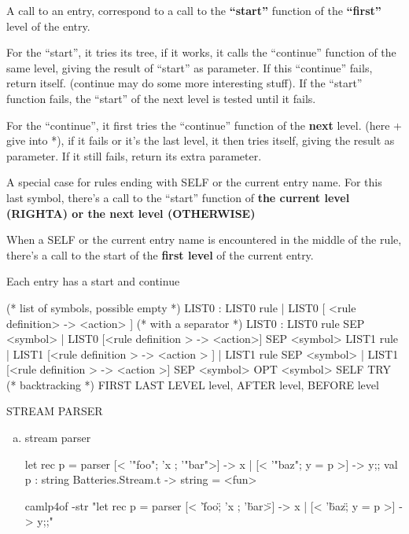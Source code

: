 \begin{enumerate}[(a)]
  A call to an entry, correspond to a call to the \textbf{``start''} function of
  the \textbf{``first''} level of the entry.

  For the ``start'', it tries its tree, if it works, it calls the
  ``continue'' function of the same level, giving the result of ``start''
  as parameter. If this ``continue'' fails, return itself. (continue may
  do some more interesting stuff). If the ``start'' function fails, the
  ``start'' of the next level is tested until it fails. 


  For the ``continue'', it first tries the ``continue'' function of the
  \textbf{next} level. (here + give into *), if it fails or it's the
  last level, it then tries itself, giving the result as parameter. If
  it still fails, return its extra parameter.

  A special case for rules ending with SELF or the current entry
  name. For this last symbol, there's a call to the ``start'' function
  of \textbf{the current level (RIGHTA) or the next level (OTHERWISE)}

  When a SELF or the current entry name is encountered in the middle
  of the rule, there's a call to the start of the \textbf{first level} of the
  current entry.

  Each entry has a start and continue

\begin{bluecode}
(* list of symbols, possible empty *)
LIST0 : LIST0 rule | LIST0 [ <rule definition> -> <action> ]
(* with a separator *)
LIST0 : LIST0 rule SEP <symbol>
| LIST0 [<rule definition > -> <action>] SEP <symbol>
  LIST1 rule
| LIST1 [<rule definition > -> <action > ]
| LIST1 rule SEP <symbol>
| LIST1 [<rule definition > -> <action >] SEP <symbol>
OPT <symbol>
SELF
TRY (* backtracking *)
FIRST LAST LEVEL level, AFTER level, BEFORE level 
\end{bluecode}

STREAM PARSER 
  \begin{enumerate}[(a)]
  \item stream parser

\begin{alternate}
let rec p = parser [< '"foo"; 'x ; '"bar">] -> x | [< '"baz"; y = p >] -> y;;
val p : string Batteries.Stream.t -> string = <fun>
\end{alternate}

\begin{redcode}
camlp4of  -str "let rec p = parser [< '\"foo\"; 'x ; '\"bar\">] -> x | [< '\"baz\"; y = p >] -> y;;"
\end{redcode}


\end{enumerate}
\end{enumerate}
